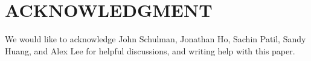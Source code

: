\documentclass[a4paper, 10pt, conference]{ieeeconf}      %
\begin{document}





\section*{ACKNOWLEDGMENT}

We would like to acknowledge John Schulman, Jonathan Ho, Sachin Patil, Sandy Huang, and Alex Lee for 
helpful discussions, and writing help with this paper.




\end{document}

